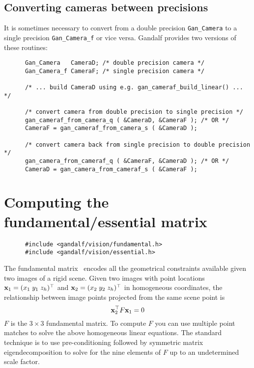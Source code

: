 \subsection{Converting cameras between precisions}
It is sometimes necessary to convert from a double precision {\tt Gan\_Camera}
to a single precision {\tt Gan\_Camera\_f} or vice versa. Gandalf provides
two versions of these routines:
\begin{verbatim}
      Gan_Camera   CameraD; /* double precision camera */
      Gan_Camera_f CameraF; /* single precision camera */

      /* ... build CameraD using e.g. gan_cameraf_build_linear() ... */

      /* convert camera from double precision to single precision */
      gan_cameraf_from_camera_q ( &CameraD, &CameraF ); /* OR */
      CameraF = gan_cameraf_from_camera_s ( &CameraD );

      /* convert camera back from single precision to double precision */
      gan_camera_from_cameraf_q ( &CameraF, &CameraD ); /* OR */
      CameraD = gan_camera_from_cameraf_s ( &CameraF );
\end{verbatim}

\section{Computing the fundamental/essential matrix} \label{fun-ess-sec}
\begin{verbatim}
      #include <gandalf/vision/fundamental.h>
      #include <gandalf/vision/essential.h>
\end{verbatim}
The fundamental matrix~\cite{Luong:Faugeras:IJCV96} encodes all the
geometrical constraints available given two images of a rigid scene.
Given two images with point locations ${\bf x}_1=(x_1\;y_1\;z_h)^{\top}$ and
${\bf x}_2=(x_2\;y_2\;z_h)^{\top}$ in homogeneous coordinates,
the relationship between image points projected from the same scene point is
\[ {\bf x}_2^{\top} F {\bf x}_1 = 0
\]
$F$ is the $3\times 3$ fundamental matrix. To compute $F$ you can use
multiple point matches to solve the above homogeneous linear equations.
The standard technique is to use pre-conditioning followed by
symmetric matrix eigendecomposition to solve for the nine elements of
$F$ up to an undetermined scale factor. 

